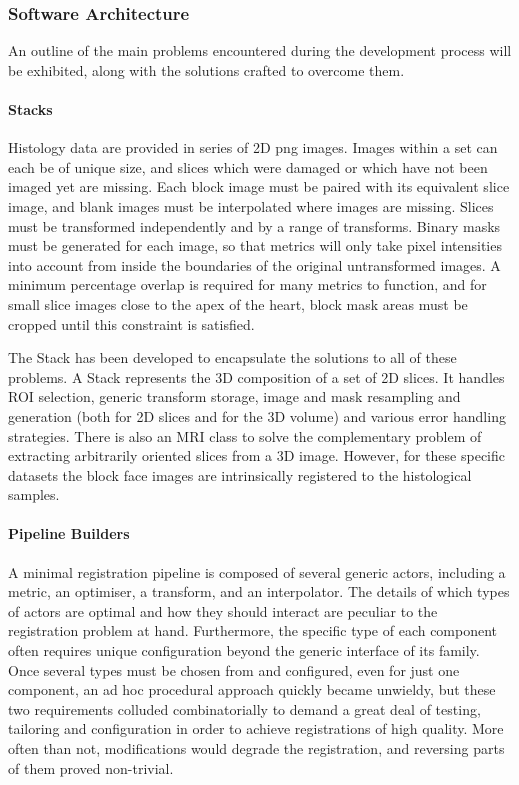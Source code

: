     \subsubsection{Software Architecture}
      An outline of the main problems encountered during the development process will be exhibited, along with the solutions crafted to overcome them.
      
      \paragraph{Stacks}
        Histology data are provided in series of 2D png images. Images within a set can each be of unique size, and slices which were damaged or which have not been imaged yet are missing. Each block image must be paired with its equivalent slice image, and blank images must be interpolated where images are missing. Slices must be transformed independently and by a range of transforms. Binary masks must be generated for each image, so that metrics will only take pixel intensities into account from inside the boundaries of the original untransformed images. A minimum percentage overlap is required for many metrics to function, and for small slice images close to the apex of the heart, block mask areas must be cropped until this constraint is satisfied.
        
        The Stack has been developed to encapsulate the solutions to all of these problems. A Stack represents the 3D composition of a set of 2D slices. It handles ROI selection, generic transform storage, image and mask resampling and generation (both for 2D slices and for the 3D volume) and various error handling strategies. There is also an MRI class to solve the complementary problem of extracting arbitrarily oriented slices from a 3D image. However, for these specific datasets the block face images are intrinsically registered to the histological samples.
  
      \paragraph{Pipeline Builders}
        A minimal registration pipeline is composed of several generic actors, including a metric, an optimiser, a transform, and an interpolator. The details of which types of actors are optimal and how they should interact are peculiar to the registration problem at hand. Furthermore, the specific type of each component often requires unique configuration beyond the generic interface of its family. Once several types must be chosen from and configured, even for just one component, an ad hoc procedural approach quickly became unwieldy, but these two requirements colluded combinatorially to demand a great deal of testing, tailoring and configuration in order to achieve registrations of high quality. More often than not, modifications would degrade the registration, and reversing parts of them proved non-trivial.

